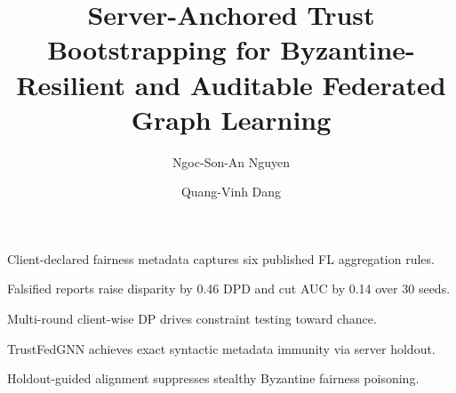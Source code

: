\documentclass[preprint,12pt]{elsarticle}
\begin{document}
\begin{frontmatter}

\title{Server-Anchored Trust Bootstrapping for Byzantine-Resilient and Auditable Federated Graph Learning}

\author[inst1]{Ngoc-Son-An Nguyen}

\author[inst2]{Quang-Vinh Dang}



\begin{highlights}
\item Client-declared fairness metadata captures six published FL aggregation rules.
\item Falsified reports raise disparity by 0.46 DPD and cut AUC by 0.14 over 30 seeds.
\item Multi-round client-wise DP drives constraint testing toward chance.
\item TrustFedGNN achieves exact syntactic metadata immunity via server holdout.
\item Holdout-guided alignment suppresses stealthy Byzantine fairness poisoning.
\end{highlights}


\end{frontmatter}
\end{document}
